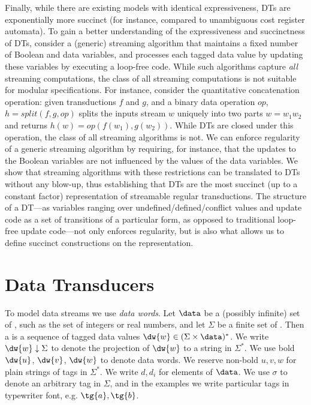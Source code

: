 Finally, while there are existing models
with identical expressiveness, DTs are exponentially more succinct (for instance, compared
to unambiguous cost register automata). To gain a better understanding of the
expressiveness and succinctness of DTs,
consider a (generic) streaming algorithm that maintains a fixed number of Boolean and data
variables, and processes each tagged data value by updating these variables by executing a loop-free
code. While such algorithms capture \emph{all} streaming computations, the class of all streaming
computations is not suitable for modular specifications.
For instance, consider the quantitative concatenation operation:
given transductions $f$ and $g$, and a binary data operation ${\textit{op}}$,
$h={\textit{split}}(f,g,{\textit{op}})$ splits the inputs stream $w$ uniquely into two parts $w=w_1w_2$ and
returns $h(w)={\textit{op}}(f(w_1),g(w_2))$.
While DTs are closed under this operation, the class
of all streaming algorithms is not.
We can enforce regularity of a generic streaming algorithm by requiring, for instance, that the updates to the Boolean
variables are not influenced by the values of the data variables. We show that streaming algorithms
with these restrictions can be translated to DTs without any blow-up, thus establishing that
DTs are the most succinct (up to a constant factor) representation of streamable regular transductions.
The structure of a DT---as variables ranging over undefined/defined/conflict values and update code as a set
of transitions of a particular form, as opposed to traditional loop-free update code---not only enforces regularity, but is also what allows us to define succinct constructions
on the representation.

\section{Data Transducers}
\label{dt:sec:model}
\label{dt:subsec:preliminaries}

To model data streams we use \emph{data words}.
Let $\data$ be a (possibly infinite) set of ,
such as the set of integers or real numbers,
and let $\Sigma$ be a finite set of .
Then a  is a sequence of tagged data values
$\dw{w} \in (\Sigma \times \data)^*$.
We write $\dw{w} \downarrow \Sigma$ to denote
the projection of $\dw{w}$ to a string in $\Sigma^*$.
We use bold $\dw{u}$, $\dw{v}$, $\dw{w}$ to denote data words.
We reserve non-bold $u, v, w$ for plain strings of tags in $\Sigma^*$.
We write $d, d_i$ for elements of $\data$.
We use $\sigma$ to denote an arbitrary tag in $\Sigma$,
and in the examples we write particular tags in typewriter font, e.g. $\tg{a}, \tg{b}$.

